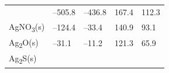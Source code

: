 \documentclass[
  9pt,
]{extbook}
\theoremstyle{definition}
\theoremstyle{definition}
\theoremstyle{definition}
\theoremstyle{remark}
\begin{document}
\begin{longtable}[]{@{}lllll@{}}
\begin{minipage}[t]{0.10\columnwidth}
\end{minipage} & \begin{minipage}[t]{0.19\columnwidth}\raggedright
--505.8\strut
\end{minipage} & \begin{minipage}[t]{0.20\columnwidth}\raggedright
--436.8\strut
\end{minipage} & \begin{minipage}[t]{0.18\columnwidth}\raggedright
167.4\strut
\end{minipage} & \begin{minipage}[t]{0.18\columnwidth}\raggedright
112.3\strut
\end{minipage}\tabularnewline
\begin{minipage}[t]{0.10\columnwidth}\raggedright
AgNO\textsubscript{3}(s)\strut
\end{minipage} & \begin{minipage}[t]{0.19\columnwidth}\raggedright
--124.4\strut
\end{minipage} & \begin{minipage}[t]{0.20\columnwidth}\raggedright
--33.4\strut
\end{minipage} & \begin{minipage}[t]{0.18\columnwidth}\raggedright
140.9\strut
\end{minipage} & \begin{minipage}[t]{0.18\columnwidth}\raggedright
93.1\strut
\end{minipage}\tabularnewline
\begin{minipage}[t]{0.10\columnwidth}\raggedright
Ag\textsubscript{2}O(s)\strut
\end{minipage} & \begin{minipage}[t]{0.19\columnwidth}\raggedright
--31.1\strut
\end{minipage} & \begin{minipage}[t]{0.20\columnwidth}\raggedright
--11.2\strut
\end{minipage} & \begin{minipage}[t]{0.18\columnwidth}\raggedright
121.3\strut
\end{minipage} & \begin{minipage}[t]{0.18\columnwidth}\raggedright
65.9\strut
\end{minipage}\tabularnewline
\begin{minipage}[t]{0.10\columnwidth}\raggedright
Ag\textsubscript{2}S(s)\strut
\end{minipage} & \begin{minipage}[t]{0.19\columnwidth}\raggedright

\end{minipage}
\end{longtable}
\end{document}
